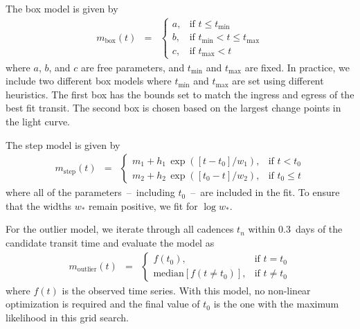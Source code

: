 \documentclass[manuscript, letterpaper]{aastex6}
\newcommand{\modelname}[1]{{\textsf{#1}}}
\begin{document}
\begin{itemize}

{\item
The \modelname{box} model is given by
\begin{eqnarray}
m_\mathrm{box}(t) &=& \left\{\begin{array}{ll}
a, & \mbox{if $t \le t_\mathrm{min}$} \\
b, & \mbox{if $t_\mathrm{min} < t \le t_\mathrm{max}$} \\
c, & \mbox{if $t_\mathrm{max} < t$}
\end{array}\right.
\end{eqnarray}
where $a$, $b$, and $c$ are free parameters, and $t_\mathrm{min}$ and
$t_\mathrm{max}$ are fixed.
In practice, we include two different \modelname{box} models where
$t_\mathrm{min}$ and $t_\mathrm{max}$ are set using different heuristics.
The first \modelname{box} has the bounds set to match the ingress and
egress of the best fit \modelname{transit}.
The second \modelname{box} is chosen based on the largest change points in the
light curve.
}

{\item
The \modelname{step} model is given by
\begin{eqnarray}
m_\mathrm{step}(t) &=& \left\{\begin{array}{ll}
m_1 + h_1\,\exp\left([t - t_0] / w_1\right), & \mbox{if $t < t_0$} \\
m_2 + h_2\,\exp\left([t_0 - t] / w_2\right), & \mbox{if $t_0 \le t$}
\end{array}\right.
\end{eqnarray}
where all of the parameters~--~including $t_0$~--~are included in the fit.
To ensure that the widths $w_*$ remain positive, we fit for $\log w_*$.
}

{\item
For the \modelname{outlier} model, we iterate through all cadences $t_n$
within 0.3~days of the candidate transit time and evaluate the model as
\begin{eqnarray}
m_\mathrm{outlier}(t) &=& \left\{\begin{array}{ll}
f(t_0), & \mbox{if $t = t_0$} \\
\mathrm{median}[f(t \ne t_0)], & \mbox{if $t \ne t_0$}
\end{array}\right.
\end{eqnarray}
where $f(t)$ is the observed time series.
With this model, no non-linear optimization is required and the final value of
$t_0$ is the one with the maximum likelihood in this grid search.
}


\end{itemize}
\end{document}
